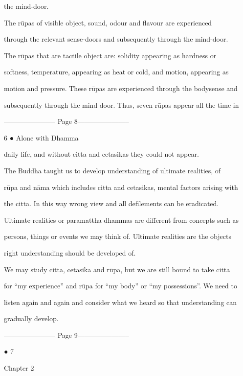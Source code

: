 the mind-door. 

   The   rūpas   of   visible   object,   sound,   odour   and   flavour   are   experienced  

through  the  relevant  sense-doors  and  subsequently  through  the  mind-door.  

The   rūpas   that   are   tactile   object   are:   solidity   appearing   as   hardness   or  

softness,  temperature,  appearing  as  heat  or  cold,  and  motion,  appearing  as  

motion and pressure. These rūpas are experienced through the bodysense and  

subsequently through the mind-door. Thus, seven rūpas appear all the time in  


----------------------- Page 8-----------------------

6 ● Alone with Dhamma 



daily life, and without citta and cetasikas they could not appear. 

   The  Buddha  taught  us  to  develop  understanding  of  ultimate  realities,  of  

rūpa and nāma which includes citta and cetasikas, mental factors arising with  

the   citta.   In   this   way   wrong   view   and   all   defilements   can   be   eradicated.  

Ultimate realities or paramattha dhammas are different from concepts such as  

persons,  things  or  events we  may think  of. Ultimate  realities  are the  objects  

right understanding should be developed of. 

   We may study citta, cetasika and rūpa, but we are still bound to take citta  

for “my experience” and rūpa for “my body” or “my possessions”. We need to  

listen again and again and consider what we heard so that understanding can  

gradually develop. 


----------------------- Page 9-----------------------

                                                                                          ● 7 



Chapter 2 




